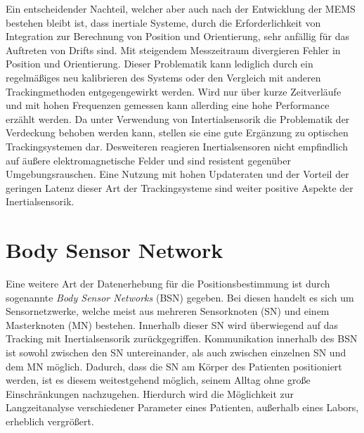 Ein entscheidender Nachteil, welcher aber auch nach der Entwicklung der MEMS bestehen bleibt ist, dass inertiale Systeme, durch die Erforderlichkeit von Integration zur Berechnung von Position und Orientierung, sehr anfällig für das Auftreten von Drifts sind. Mit steigendem Messzeitraum divergieren Fehler in Position und Orientierung. Dieser Problematik kann lediglich durch ein regelmäßiges neu kalibrieren des Systems oder den Vergleich mit anderen Trackingmethoden entgegengewirkt werden. Wird nur über kurze Zeitverläufe und mit hohen Frequenzen gemessen kann allerding eine hohe Performance erzählt werden. \cite{P24} Da unter Verwendung von Intertialsensorik die Problematik der Verdeckung behoben werden kann, stellen sie eine gute Ergänzung zu optischen Trackingsystemen dar. Desweiteren reagieren Inertialsensoren nicht empfindlich auf äußere elektromagnetische Felder und sind resistent gegenüber Umgebungsrauschen. Eine Nutzung mit hohen Updateraten und der Vorteil der geringen Latenz dieser Art der Trackingsysteme sind weiter positive Aspekte der Inertialsensorik. \cite{P31}

\section{Body Sensor Network}
Eine weitere Art der Datenerhebung für die Positionsbestimmung ist durch sogenannte \textit{Body Sensor Networks} (BSN) gegeben.
Bei diesen handelt es sich um Sensornetzwerke, welche meist aus mehreren Sensorknoten (SN) und einem Masterknoten (MN) bestehen.
Innerhalb dieser SN wird überwiegend auf das Tracking mit Inertialsensorik zurückgegriffen.
Kommunikation innerhalb des BSN ist sowohl zwischen den SN untereinander, als auch zwischen einzelnen SN und dem MN möglich.
Dadurch, dass die SN am Körper des Patienten positioniert werden, ist es diesem weitestgehend möglich, seinem Alltag ohne große Einschränkungen nachzugehen.
Hierdurch wird die Möglichkeit zur Langzeitanalyse verschiedener Parameter eines Patienten, außerhalb eines Labors, erheblich vergrößert.

